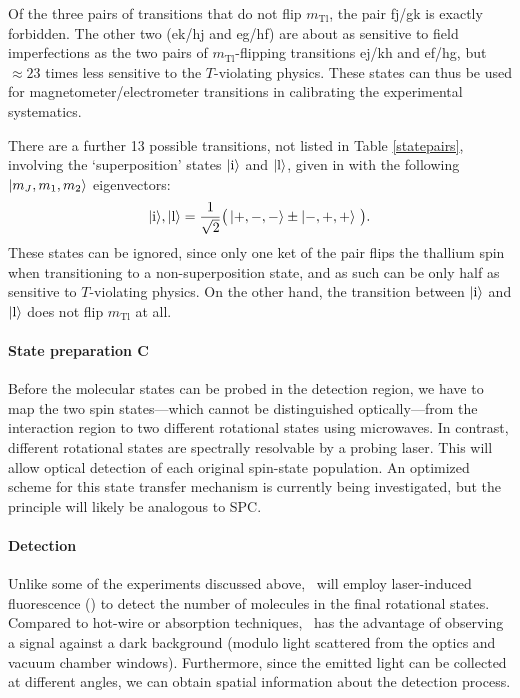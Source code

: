 Of the three pairs of transitions that do not flip $m_\text{Tl}$, the pair fj/gk
is exactly forbidden. The other two (ek/hj and eg/hf) are about as sensitive to
field imperfections as the two pairs of $m_\text{Tl}$-flipping transitions ej/kh
and ef/hg, but $\approx23$ times less sensitive to the $T$-violating physics.
These states can thus be used for magnetometer/electrometer transitions in
calibrating the experimental systematics.

There are a further 13 possible transitions, not listed in Table
\ref{statepairs}, involving the `superposition' states $|\text{i}\rangle$ and
$|\text{l}\rangle$, given in \cite[Table~I]{cho1991search} with the following
$|m_J,m_1,m_2\rangle$ eigenvectors:
%
\[
    |\text{i}\rangle,|\text{l}\rangle
    =
    \frac{1}{\sqrt2}
    \big(
    \,
        |+,-,-\rangle\pm|-,+,+\rangle\
    \big).
\]
%
These states can be ignored, since only one ket of the pair flips the thallium
spin when transitioning to a non-superposition state, and as such can be only
half as sensitive to $T$-violating physics. On the other hand, the transition
between $|\text{i}\rangle$ and $|\text{l}\rangle$ does not flip $m_\text{Tl}$ at
all.

\paragraph{State preparation C}

Before the molecular states can be probed in the detection region, we have to
map the two spin states---which cannot be distinguished optically---from the
interaction region to two different rotational states using microwaves. In
contrast, different rotational states are spectrally resolvable by a probing
laser. This will allow optical detection of each original spin-state population.
\cite[sect~2.7]{grasdijk2021centrex} An optimized scheme for this state transfer
mechanism is currently being investigated, but the principle will likely be
analogous to SPC.

\paragraph{Detection}

Unlike some of the experiments discussed above, \CENTREX\ will employ
laser-induced fluorescence (\LIF) to detect the number of molecules in the final
rotational states. Compared to hot-wire or absorption techniques, \LIF\ has the
advantage of observing a signal against a dark background (modulo light
scattered from the optics and vacuum chamber windows).
\cite{tango1968spectroscopy} Furthermore, since the emitted light can be
collected at different angles, we can obtain spatial information about the
detection process. \cite{zare2012my}

